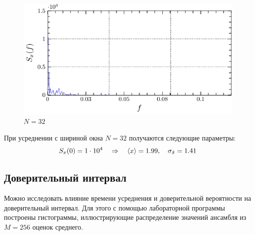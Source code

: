 \documentclass[a4paper,14pt]{extarticle}
\begin{document}
\begin{figure}[H]
    \centering
    \includegraphics[width=0.7\linewidth]{fig/S_from_f_100_ex52_n32}
    \vspace{-0.7em}
    \caption{$N=32$}
    \label{fig:sko_ex52_n32}
\end{figure}

При усреднении с шириной окна $N=32$ получаются следующие параметры:
\begin{equation}
    S_x(0) = 1 \cdot 10^4
    \quad \Rightarrow \quad
    \langle x\rangle=1.99, \quad
    \sigma_{\tilde{x}} =  1.41
\end{equation}

\subsection{Доверительный интервал}
Можно исследовать влияние времени усреднения и доверительной вероятности на доверительный интервал. Для этого с помощью лабораторной программы построены гистограммы, иллюстрирующие распределение значений ансамбля из $M=256$ оценок среднего.
\end{document}
